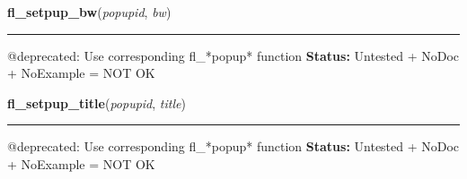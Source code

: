     \label{xformslib:deprecated:fl_setpup_bw}

    \vspace{0.5ex}

\hspace{.8\funcindent}\begin{boxedminipage}{\funcwidth}

    \raggedright \textbf{fl\_setpup\_bw}(\textit{popupid}, \textit{bw})

    \vspace{-1.5ex}

    \rule{\textwidth}{0.5\fboxrule}
\setlength{\parskip}{2ex}

@deprecated: Use corresponding fl\_*popup* function
\setlength{\parskip}{1ex}
\textbf{Status:} 
Untested + NoDoc + NoExample = NOT OK


    \end{boxedminipage}

    \label{xformslib:deprecated:fl_setpup_title}

    \vspace{0.5ex}

\hspace{.8\funcindent}\begin{boxedminipage}{\funcwidth}

    \raggedright \textbf{fl\_setpup\_title}(\textit{popupid}, \textit{title})

    \vspace{-1.5ex}

    \rule{\textwidth}{0.5\fboxrule}
\setlength{\parskip}{2ex}

@deprecated: Use corresponding fl\_*popup* function
\setlength{\parskip}{1ex}
\textbf{Status:} 
Untested + NoDoc + NoExample = NOT OK


    \end{boxedminipage}

    \label{xformslib:deprecated:fl_setpup_entercb}

    \vspace{0.5ex}

